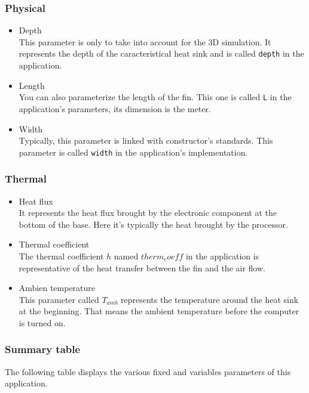 \subsubsection{Physical}
\begin{itemize}
\item{Depth} \\
This parameter is only to take into account for the 3D simulation. It represents the depth of the caracteristical heat sink and is called \lstinline!depth! in the application.

\item{Length} \\
You can also parameterize the length of the fin. This one is called \lstinline!L! in the application's parameters, its dimension is the meter.

\item{Width} \\
Typically, this parameter is linked with constructor's standards. This parameter is called \lstinline!width! in the application's implementation.
\end{itemize}

\subsubsection{Thermal}
\begin{itemize}

\item{Heat flux} \\
It represents the heat flux brought by the electronic component at the bottom of the base. Here it's typically the heat brought by the processor.

\item{Thermal coefficient} \\
The thermal coefficient $h$ named $therm_coeff$ in the application is representative of the heat transfer between the fin and the air flow. 

\item{Ambien temperature} \\
This parameter called $T_{amb}$ represents the temperature around the heat sink at the beginning. That means the ambient temperature before the computer is turned on.

\end{itemize}

\subsubsection{Summary table}
The following table displays the various fixed and variables parameters of this application.
\clearpage


